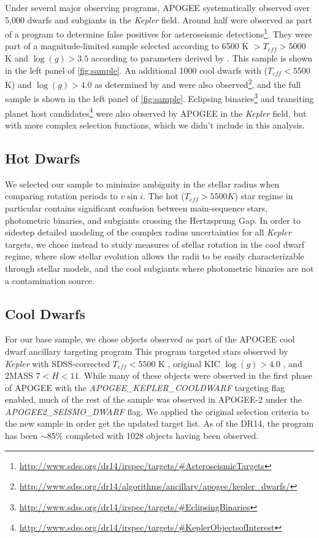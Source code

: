 \documentclass[manuscript]{aastex6}
\newcommand{\vsini}{\ensuremath{v \sin i}}
\newcommand{\Kepler}{\mbox{\textit{Kepler}}}
\newcommand{\Teff}{\ensuremath{T_{eff}}}
\newcommand{\logg}{\ensuremath{\log(g)}}
\begin{document}
Under several major observing programs, APOGEE systematically observed over 
5,000 dwarfs and subgiants in the \Kepler{} field. Around half were
observed as part of a program to determine false positives for
asteroseismic
detections\footnote{\url{http://www.sdss.org/dr14/irspec/targets/\#AsteroseismicTargets}}. 
They were part of a magnitude-limited sample
selected according to 6500 K \(> \Teff > 5000\) K and \(\logg > 3.5\)
according to parameters derived by \citet{Huber14} \citep{Zasowski17}.
This sample is shown in the left panel of \cref{fig:sample}. An additional 
1000 cool dwarfs with (\(\Teff < 5500\) K) and \(\logg > 4.0\) as determined
by \citet{Pinsonneault12} and \citet{Brown11} were also 
observed\footnote{\url{http://www.sdss.org/dr14/algorithms/ancillary/apogee/kepler_dwarfs/}}, 
and the full sample is shown in the left panel of \cref{fig:sample}. 
Eclipsing
binaries\footnote{\url{http://www.sdss.org/dr14/irspec/targets/\#EclipsingBinaries}} 
and transiting planet host 
candidates\footnote{\url{http://www.sdss.org/dr14/irspec/targets/\#KeplerObjectsofInterest}} 
were also observed 
by APOGEE in the \Kepler{} field, but with more complex selection functions, 
which we didn't include in this analysis.

\subsection{Hot Dwarfs}

We selected our sample to minimize ambiguity in the stellar radius when
comparing rotation periods to \vsini. The hot (\(\Teff > 5500 K\)) star regime
in particular contains significant confusion between main-sequence stars,
photometric binaries, and subgiants crossing the Hertzsprung Gap.
In order to sidestep detailed modeling of the complex radius uncertainties 
for all \Kepler{} targets, we chose instead to study measures of
stellar rotation in the cool dwarf regime, where
slow stellar evolution allows the radii to be easily characterizable through
stellar models, and the cool subgiants where photometric binaries are not a
contamination source. 

\subsection{Cool Dwarfs}

For our base sample, we chose objects observed as part of the APOGEE cool
dwarf ancillary targeting
program
This program targeted stars observed by \Kepler{} with SDSS-corrected
\(\Teff < 5500\) K \citep{Pinsonneault12}, original KIC \(\logg > 4.0\)
\citep{Brown11}, and 2MASS \(7 < H < 11\). While many of these objects
were observed in the first phase of APOGEE with the
\textit{APOGEE\_KEPLER\_COOLDWARF} targeting flag enabled, much of the rest of
the sample was observed in APOGEE-2 under the \textit{APOGEE2\_SEISMO\_DWARF}
flag. We applied the original selection criteria to the new sample in order get
the updated target list. As of the DR14, the program has been \(\sim 85\)\% 
completed with 1028 objects having been observed. 
\end{document}
